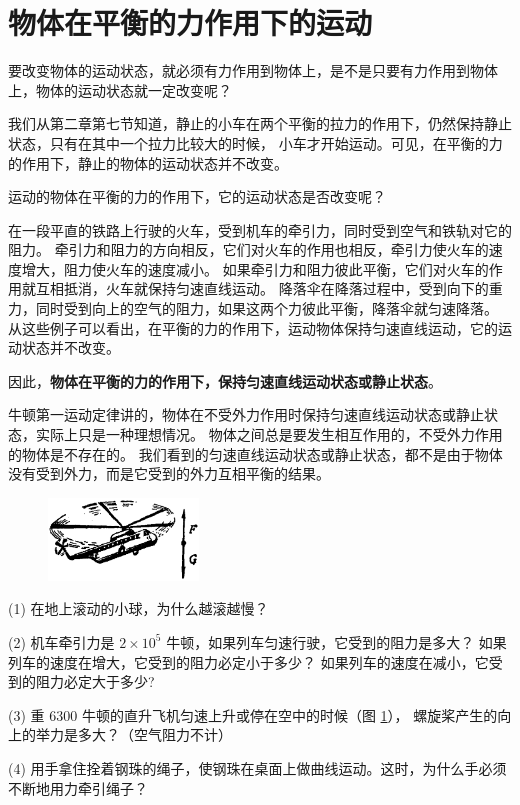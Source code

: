 \section{物体在平衡的力作用下的运动}\label{sec:3-9}

要改变物体的运动状态，就必须有力作用到物体上，是不是只要有力作用到物体上，物体的运动状态就一定改变呢？

我们从第二章第七节知道，静止的小车在两个平衡的拉力的作用下，仍然保持静止状态，只有在其中一个拉力比较大的时候，
小车才开始运动。可见，在平衡的力的作用下，静止的物体的运动状态并不改变。

运动的物体在平衡的力的作用下，它的运动状态是否改变呢？

在一段平直的铁路上行驶的火车，受到机车的牵引力，同时受到空气和铁轨对它的阻力。
牵引力和阻力的方向相反，它们对火车的作用也相反，牵引力使火车的速度增大，阻力使火车的速度减小。
如果牵引力和阻力彼此平衡，它们对火车的作用就互相抵消，火车就保持匀速直线运动。
降落伞在降落过程中，受到向下的重力，同时受到向上的空气的阻力，如果这两个力彼此平衡，降落伞就匀速降落。
从这些例子可以看出，在平衡的力的作用下，运动物体保持匀速直线运动，它的运动状态并不改变。

因此，\textbf{物体在平衡的力的作用下，保持匀速直线运动状态或静止状态}。

牛顿第一运动定律讲的，物体在不受外力作用时保持匀速直线运动状态或静止状态，实际上只是一种理想情况。
物体之间总是要发生相互作用的，不受外力作用的物体是不存在的。
我们看到的匀速直线运动状态或静止状态，都不是由于物体没有受到外力，而是它受到的外力互相平衡的结果。


\lianxi

\begin{figure}
    \centering
    \includegraphics[width=4cm]{../pic/czwl1-ch3-8}
    \caption{}\label{fig:3-8}
\end{figure}

(1) 在地上滚动的小球，为什么越滚越慢？

(2) 机车牵引力是 $2 \times 10^5$ 牛顿，如果列车匀速行驶，它受到的阻力是多大？
如果列车的速度在增大，它受到的阻力必定小于多少？
如果列车的速度在减小，它受到的阻力必定大于多少?

(3) 重 6300 牛顿的直升飞机匀速上升或停在空中的时候（图 \ref{fig:3-8}），
螺旋桨产生的向上的举力是多大？（空气阻力不计）

(4) 用手拿住拴着钢珠的绳子，使钢珠在桌面上做曲线运动。这时，为什么手必须不断地用力牵引绳子？

